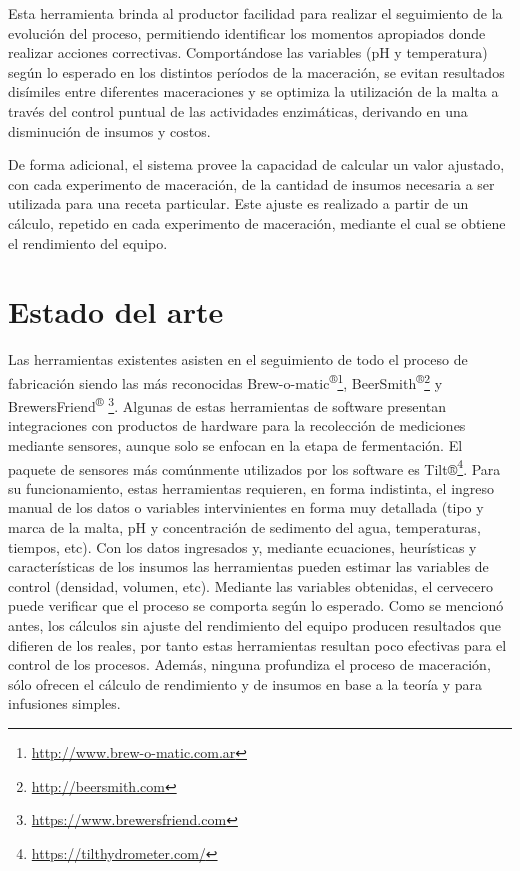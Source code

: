     \par
    Esta herramienta brinda al productor facilidad para realizar el seguimiento de la evolución del proceso, permitiendo identificar los momentos apropiados donde realizar acciones correctivas. Comportándose las variables (pH y temperatura) según lo esperado en los distintos períodos de la maceración, se evitan resultados disímiles entre diferentes maceraciones y se optimiza la utilización de la malta a través del control puntual de las actividades enzimáticas, derivando en una disminución de insumos y costos.
    \par
    De forma adicional, el sistema provee la capacidad de calcular un valor ajustado, con cada experimento de maceración, de la cantidad de insumos necesaria a ser utilizada para una receta particular. Este ajuste es realizado a partir de un cálculo, repetido en cada experimento de maceración, mediante el cual se obtiene el rendimiento del equipo.
    
\section{Estado del arte}
    \par
    Las herramientas existentes asisten en el seguimiento de todo el proceso de fabricación siendo las más reconocidas Brew-o-matic\textsuperscript{®}\footnote{\url{http://www.brew-o-matic.com.ar}}, BeerSmith\textsuperscript{®}\footnote{\url{http://beersmith.com}} y BrewersFriend\textsuperscript{®} \footnote{\url{https://www.brewersfriend.com}}. Algunas de estas herramientas de software presentan integraciones con productos de hardware para la recolección de mediciones mediante sensores, aunque solo se enfocan en la etapa de fermentación. El paquete de sensores más comúnmente utilizados por los software es Tilt®\footnote{\url{https://tilthydrometer.com/}}. Para su funcionamiento, estas herramientas requieren, en forma indistinta, el ingreso manual de los datos o variables intervinientes en forma muy detallada (tipo y marca de la malta, pH y concentración de sedimento del agua, temperaturas, tiempos, etc). Con los datos ingresados y, mediante ecuaciones, heurísticas y características de los insumos las herramientas pueden estimar las variables de control (densidad, volumen, etc). Mediante las variables obtenidas, el cervecero puede verificar que el proceso se comporta según lo esperado. Como se mencionó antes, los cálculos sin ajuste del rendimiento del equipo producen resultados que difieren de los reales, por tanto estas herramientas resultan poco efectivas para el control de los procesos. Además, ninguna profundiza el proceso de maceración, sólo ofrecen el cálculo de rendimiento y de insumos en base a la teoría y para infusiones simples.

